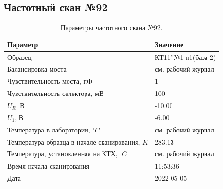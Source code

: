 \subsection{Частотный скан №92}
\begin{table}[!ht]
    \centering
    \caption{Параметры частотного скана №92.}
    \begin{tabular}{|l|l|}
        \hline
        Параметр                                       & Значение                  \\ \hline
        Образец                                        & КТ117№1 п1(база 2)        \\ \hline
        Балансировка моста                             & см. рабочий журнал        \\ \hline
        Чувствительность моста, пФ                     & 1                         \\ \hline
        Чувствительность селектора, мВ                 & 100                       \\ \hline
        $U_R$, В                                       & -10.00                    \\ \hline
        $U_1$, В                                       & -6.00                     \\ \hline
        Температура в лаборатории, $^\circ C$          & см. рабочий журнал        \\ \hline
        Температура образца в начале сканирования, $K$ & 283.13                    \\ \hline
        Температура, установленная на КТХ, $^\circ C$  & см. рабочий журнал        \\ \hline
        Время начала сканирования                      & 11:53:36                  \\ \hline
        Дата                                           & 2022-05-05                \\ \hline
    \end{tabular}
    \label{table:frequency_scan_92}
\end{table}

